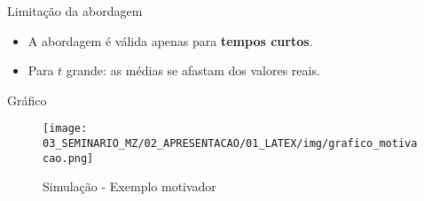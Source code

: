 
\begin{frame}{Limitação da abordagem}
	\begin{itemize}
		\item A abordagem  é válida apenas para \textbf{tempos curtos}.
		\item Para $t$ grande: as médias se afastam dos valores reais.
	\end{itemize}
\end{frame}


\begin{frame}{Gráfico}
	\begin{figure}[h]
		\centering
		\texttt{[image: 03\_SEMINARIO\_MZ/02\_APRESENTACAO/01\_LATEX/img/grafico\_motivacao.png]}
		\caption{Simulação - Exemplo motivador}
		\label{fig:simulacao_exemplo_motivador}
	\end{figure}
\end{frame}
